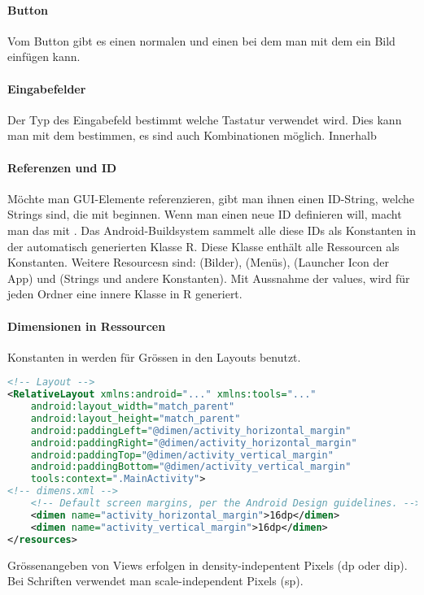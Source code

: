 \paragraph{Button} Vom Button gibt es einen normalen  und einen  bei dem man mit dem  ein Bild einfügen kann.
\paragraph{Eingabefelder} Der Typ des Eingabefeld bestimmt welche Tastatur verwendet wird. Dies kann man mit dem  bestimmen, es sind auch Kombinationen möglich. Innerhalb 
\paragraph{Referenzen und ID} Möchte man GUI-Elemente referenzieren, gibt man ihnen einen ID-String, welche Strings sind, die mit  beginnen. Wenn man einen neue ID definieren will, macht man das mit . Das Android-Buildsystem sammelt alle diese IDs als Konstanten in der automatisch generierten Klasse R. Diese Klasse enthält alle Ressourcen als Konstanten. Weitere Resourcesn sind:  (Bilder),  (Menüs),  (Launcher Icon der App) und  (Strings und andere Konstanten). Mit Aussnahme der values, wird für jeden Ordner eine innere Klasse in R generiert.
\paragraph{Dimensionen in Ressourcen} Konstanten in  werden für Grössen in den Layouts benutzt.
\begin{lstlisting}[language=xml]
<!-- Layout -->
<RelativeLayout xmlns:android="..." xmlns:tools="..."
    android:layout_width="match_parent"
    android:layout_height="match_parent"
    android:paddingLeft="@dimen/activity_horizontal_margin"
    android:paddingRight="@dimen/activity_horizontal_margin"
    android:paddingTop="@dimen/activity_vertical_margin"
    android:paddingBottom="@dimen/activity_vertical_margin"
    tools:context=".MainActivity">
<!-- dimens.xml -->
    <!-- Default screen margins, per the Android Design guidelines. -->
    <dimen name="activity_horizontal_margin">16dp</dimen>
    <dimen name="activity_vertical_margin">16dp</dimen>
</resources>
\end{lstlisting}
Grössenangeben von Views erfolgen in density-indepentent Pixels (dp oder dip). Bei Schriften verwendet man scale-independent Pixels (sp).
